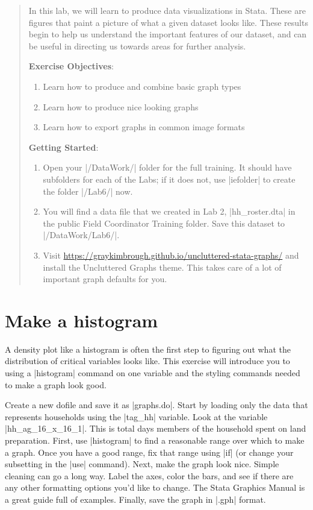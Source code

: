\documentclass{tufte-handout}
\begin{document}
\begin{abstract}
In this lab, we will learn to produce data visualizations in Stata.
These are figures that paint a picture of what a given dataset looks like.
These results begin to help us understand the important features of our dataset,
and can be useful in directing us towards areas for further analysis.

\bigskip\noindent \textbf{Exercise Objectives}:
\begin{enumerate}
  \item Learn how to produce and combine basic graph types
  \item Learn how to produce nice looking graphs
  \item Learn how to export graphs in common image formats
\end{enumerate}

\bigskip\noindent \textbf{Getting Started}:
\begin{enumerate}
 \item Open your |/DataWork/| folder for the full training. It should have subfolders for each of the Labs; if it does not, use |iefolder| to create the folder |/Lab6/| now.
 \item You will find a data file that we created in Lab 2, |hh_roster.dta| in the public Field Coordinator Training folder. Save this dataset to |/DataWork/Lab6/|.
 \item Visit \url{https://graykimbrough.github.io/uncluttered-stata-graphs/} and
 install the Uncluttered Graphs theme. This takes care of a lot
 of important graph defaults for you.
\end{enumerate}
\end{abstract}

\section{Make a histogram}

A density plot like a histogram is often the first step to figuring out
what the distribution of critical variables looks like.
This exercise will introduce you to using a |histogram| command
on one variable and the styling commands needed to make a graph look good.

Create a new dofile and save it as |graphs.do|.
Start by loading only the data that represents households using the |tag_hh| variable.
Look at the variable |hh_ag_16_x_16_1|.
This is total days members of the household spent on land preparation.
First, use |histogram| to find a reasonable range over which to make a graph.
Once you have a good range, fix that range using |if|
(or change your subsetting in the |use| command).
Next, make the graph look nice.
Simple cleaning can go a long way.
Label the axes, color the bars, and see if there are any other
formatting options you'd like to change.
The Stata Graphics Manual is a great guide full of examples.
Finally, save the graph in |.gph| format.
\end{document}
